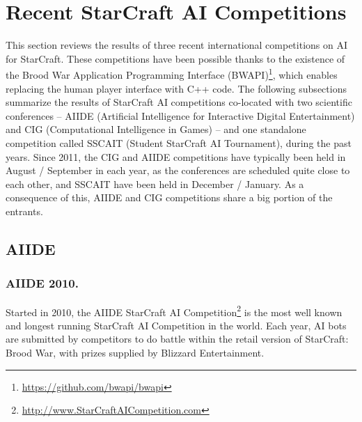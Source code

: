 \documentclass{llncs}
\begin{document}
\section{Recent StarCraft AI Competitions}\label{sec:competition}

This section reviews the results of three recent international competitions on AI for StarCraft. These competitions
have been possible thanks to the existence of the Brood War Application Programming Interface 
(BWAPI)\footnote{\url{https://github.com/bwapi/bwapi}}, which 
enables replacing the human player interface with C++ code.
The following subsections summarize the results of StarCraft AI competitions co-located with two scientific conferences -- AIIDE (Artificial Intelligence for Interactive Digital Entertainment) and CIG (Computational Intelligence in Games) -- and one stand\-alone competition called SSCAIT (Student StarCraft AI Tournament), during the past years. Since 2011, the CIG and AIIDE competitions have typically been held in August / September in each year, as the conferences are scheduled quite close to each other, and SSCAIT have been held in December / January. As a consequence of this, AIIDE and CIG competitions share a big portion of the entrants.


\subsection{AIIDE}\label{sec:AIIDE}

\subsubsection{AIIDE 2010.}

Started in 2010, the AIIDE StarCraft AI Competition\footnote{\url{http://www.StarCraftAICompetition.com}} is the most
well known and longest running StarCraft AI Competition in the world. Each year,
AI bots are submitted by competitors to do battle within the retail version of
StarCraft: Brood War, with prizes supplied by Blizzard Entertainment. %
\end{document}
